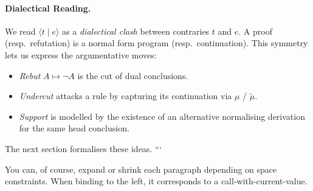 \documentclass{ecai}
\begin{document}
\begin{gpt}
\paragraph{Dialectical Reading.}
We read $\langle t \mid e\rangle$ as a \emph{dialectical clash} between
contraries $t$ and $e$.  A proof (resp.\ refutation) is a normal form
program (resp.\ continuation).  This symmetry lets us express the
argumentative moves:

\begin{itemize}
\item \emph{Rebut} $A\mapsto\neg A$ is the cut of dual conclusions.
\item \emph{Undercut} attacks a rule by capturing its continuation via
      $\mu$ / $\tilde\mu$.
\item \emph{Support} is modelled by the existence of an alternative
      normalising derivation for the same head conclusion.
\end{itemize}

The next section formalises these ideas.
```

You can, of course, expand or shrink each paragraph depending on space
constraints.
When binding to the left, it corresponds to a call-with-current-value.
\end{gpt}



\end{document}
